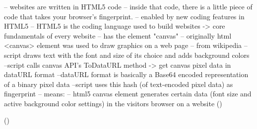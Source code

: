 -- websites are written in HTML5 code
-- inside that code, there is a little piece of code that takes your browser’s fingerprint.
-- enabled by new coding features in HTML5
-- HTML5 is the coding language used to build websites -> core fundamentals of every website
-- has the element "canvas"
-- originally html <canvas> element was used to draw graphics on a web page
-- from wikipedia
	--script draws text with the font and size of its choice and adds background colors
	--script calls canvas API's ToDataURL method -> get canvas pixel data in dataURL format
	--dataURL format is basically a Base64 encoded  representation of a binary pixel data
	--script uses this hash (of text-encoded pixel data) as fingerprint
-- means:
-- html5 canvas element generates certain data (font size and active background color settings) in the visitors browser on a website
(\textcite{pixel18})

(\textcite{mowery12})

